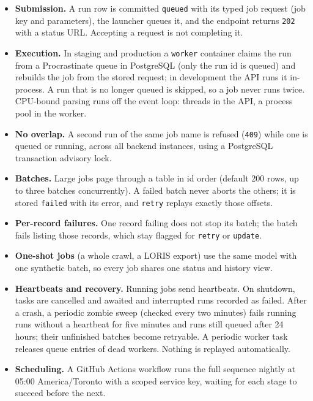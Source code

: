 \documentclass[11pt,letterpaper]{report}
\begin{document}
\begin{itemize}
  \item \textbf{Submission.} A run row is committed \texttt{queued} with its typed job request (job key and
        parameters), the launcher queues it, and the endpoint returns \texttt{202} with a status URL.
        Accepting a request is not completing it.
  \item \textbf{Execution.} In staging and production a \texttt{worker} container claims the run from a
        Procrastinate queue in PostgreSQL (only the run id is queued) and rebuilds the job from the stored
        request; in development the API runs it in-process. A run that is no longer queued is skipped, so a
        job never runs twice. CPU-bound parsing runs off the event loop: threads in the API, a process
        pool in the worker.
  \item \textbf{No overlap.} A second run of the same job name is refused (\texttt{409}) while one is
        queued or running, across all backend instances, using a PostgreSQL transaction advisory lock.
  \item \textbf{Batches.} Large jobs page through a table in id order (default 200 rows, up to three
        batches concurrently). A failed batch never aborts the others; it is stored \texttt{failed}
        with its error, and \texttt{retry} replays exactly those offsets.
  \item \textbf{Per-record failures.} One record failing does not stop its batch; the batch fails
        listing those records, which stay flagged for \texttt{retry} or \texttt{update}.
  \item \textbf{One-shot jobs} (a whole crawl, a LORIS export) use the same model with one synthetic
        batch, so every job shares one status and history view.
  \item \textbf{Heartbeats and recovery.} Running jobs send heartbeats. On shutdown, tasks are cancelled
        and awaited and interrupted runs recorded as failed. After a crash, a periodic zombie sweep
        (checked every two minutes) fails running runs without a heartbeat for five minutes and runs
        still queued after 24 hours; their unfinished batches become retryable. A periodic worker task
        releases queue entries of dead workers. Nothing is replayed automatically.
  \item \textbf{Scheduling.} A GitHub Actions workflow runs the full sequence nightly at 05:00
        America/Toronto with a scoped service key, waiting for each stage to succeed before the next.
\end{itemize}
\end{document}
